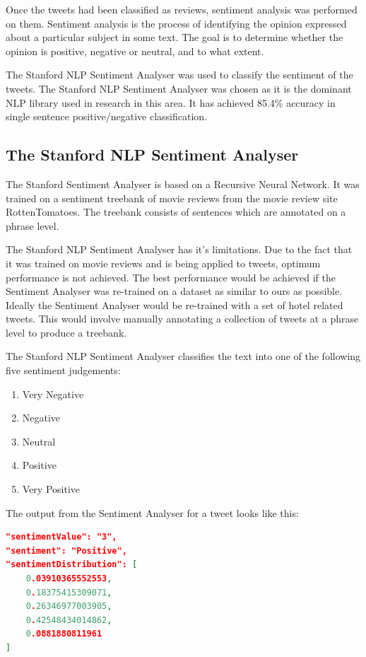 Once the tweets had been classified as reviews, sentiment analysis was performed on them. Sentiment analysis is the process of identifying the opinion expressed about a particular subject in some text. The goal is to determine whether the opinion is positive, negative or neutral, and to what extent. 

The Stanford NLP Sentiment Analyser \cite{stanfordSentiment2013} was used to classify the sentiment of the tweets. The Stanford NLP Sentiment Analyser was chosen as it is the dominant NLP library used in research in this area. It has achieved 85.4\% accuracy in single sentence positive/negative classification. 

\subsection{The Stanford NLP Sentiment Analyser}

The Stanford Sentiment Analyser is based on a Recursive Neural Network. It was trained on a sentiment treebank of movie reviews from the movie review site RottenTomatoes. The treebank consists of sentences which are annotated on a phrase level. 

The Stanford NLP Sentiment Analyser has it's limitations. Due to the fact that it was trained on movie reviews and is being applied to tweets, optimum performance is not achieved. The best performance would be achieved if the Sentiment Analyser was re-trained on a dataset as similar to ours as possible. Ideally the Sentiment Analyser would be re-trained with a set of hotel related tweets. This would involve manually annotating a collection of tweets at a phrase level to produce a treebank.

The Stanford NLP Sentiment Analyser classifies the text into one of the following five sentiment judgements: 
\begin{enumerate}
    \item Very Negative
    \item Negative
    \item Neutral
    \item Positive
    \item Very Positive
\end{enumerate}

The output from the Sentiment Analyser for a tweet looks like this:

\begin{lstlisting}[caption={Output from Stanford NLP Sentiment Analyser},
captionpos=b,label=lst:stanfordoutput,language=json,firstnumber=1]
"sentimentValue": "3",
"sentiment": "Positive",
"sentimentDistribution": [
    0.03910365552553,
    0.18375415309071,
    0.26346977003905,
    0.42548434014862,
    0.0881880811961
]
\end{lstlisting}

